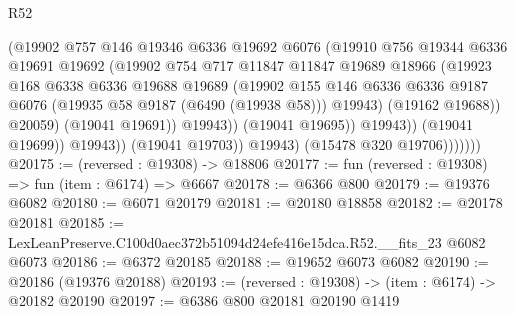 \begin{lexlean}{R52}
\begin{coremodule}
                                  (@19902
                                    @757
                                    @146
                                    @19346
                                    @6336
                                    @19692
                                    @6076
                                    (@19910
                                      @756
                                      @19344
                                      @6336
                                      @19691
                                      @19692
                                      (@19902
                                        @754
                                        @717
                                        @11847
                                        @11847
                                        @19689
                                        @18966
                                        (@19923
                                          @168
                                          @6338
                                          @6336
                                          @19688
                                          @19689
                                          (@19902
                                            @155
                                            @146
                                            @6336
                                            @6336
                                            @9187
                                            @6076
                                            (@19935 @58 @9187 (@6490 (@19938 @58)))
                                            @19943)
                                          (@19162 @19688))
                                        @20059)
                                      (@19041 @19691))
                                    @19943))
                                (@19041 @19695))
                              @19943))
                          (@19041 @19699))
                        @19943))
                    (@19041 @19703))
                  @19943)
                (@15478 @320 @19706)))))))
@20175 := (reversed : @19308) -> @18806
@20177 := fun (reversed : @19308) => fun (item : @6174) => @6667
@20178 := @6366 @800
@20179 := @19376 @6082
@20180 := @6071 @20179
@20181 := @20180 @18858
@20182 := @20178 @20181
@20185 := LexLeanPreserve.C100d0aec372b51094d24efe416e15dca.R52.__fits_23 @6082 @6073
@20186 := @6372 @20185
@20188 := @19652 @6073 @6082
@20190 := @20186 (@19376 @20188)
@20193 := (reversed : @19308) -> (item : @6174) -> @20182 @20190
@20197 := @6386 @800 @20181 @20190 @1419

\end{coremodule}
\end{lexlean}

